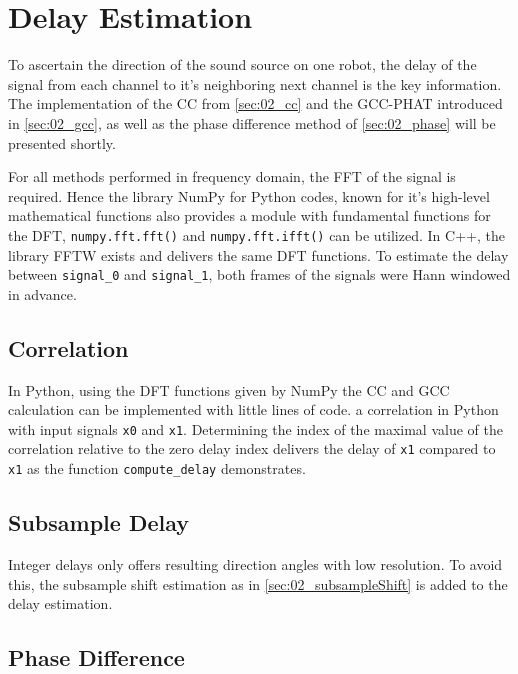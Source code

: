 \section{Delay Estimation}
\label{sec:03_delay}

To ascertain the direction of the sound source on one robot, the
delay of the signal from each channel to it's neighboring
next channel is the key information.
The implementation of the \ac{CC} from \cref{sec:02_cc} and the \ac{GCC-PHAT}
introduced in \cref{sec:02_gcc}, as well as the phase difference method
of \cref{sec:02_phase} will be presented shortly.

For all methods performed in frequency domain, the \ac{FFT} of the
signal is required. Hence the library NumPy for Python codes, known for it's high-level
mathematical functions also provides a module with fundamental
functions for the \ac{DFT}, \lstinline!numpy.fft.fft()! and
\lstinline!numpy.fft.ifft()! can be utilized.
In C++, the library \ac{FFTW} exists and delivers the same \ac{DFT} functions.
To estimate the delay between \lstinline!signal_0! and \lstinline!signal_1!,
both frames of the signals were Hann windowed in advance.
\subsection*{Correlation}
\label{subsec:03_cc}

In Python, using the \ac{DFT} functions given by NumPy the \ac{CC} and \ac{GCC} calculation
can be implemented with little lines of code.
a correlation in Python with input signals \lstinline!x0! and \lstinline!x1!.
Determining the index of the maximal value of the correlation relative to the zero delay
index delivers the delay of \lstinline!x1! compared to \lstinline!x1! as the function
\lstinline!compute_delay! demonstrates.
\subsection*{Subsample Delay}
\label{subsec:03_subsample}

Integer delays only offers resulting direction angles with low resolution.
To avoid this, the subsample shift estimation as in \cref{sec:02_subsampleShift}
is added to the delay estimation.

\subsection*{Phase Difference}
\label{subsec:03_phase}

